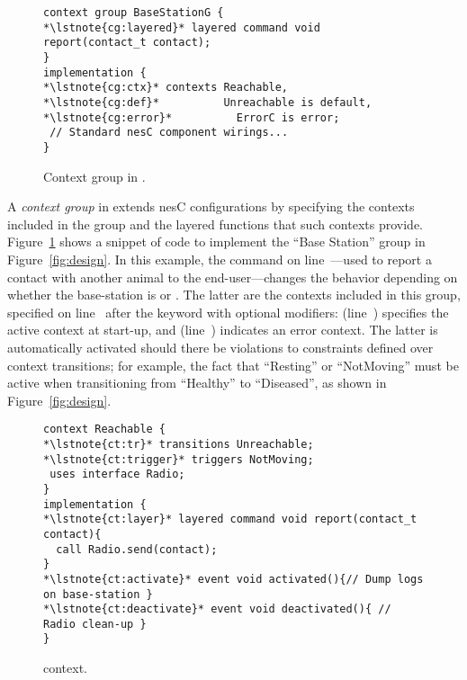 \begin{figure}[!tb]
\begin{lstlisting}[style=conescframe]
context group BaseStationG {
*\lstnote{cg:layered}* layered command void report(contact_t contact);
}
implementation {
*\lstnote{cg:ctx}* contexts Reachable, 
*\lstnote{cg:def}*          Unreachable is default,
*\lstnote{cg:error}*          ErrorC is error;
 // Standard nesC component wirings... 
}
\end{lstlisting}
\vspace{-4mm}
\caption{Context group in \conesc.}
  \label{fig:configuration}
\vspace{-2mm}
\end{figure}

A \emph{context group} in \conesc extends nesC configurations
by specifying the contexts included in the group and the layered
functions that such contexts provide.  Figure~\ref{fig:configuration}
shows a snippet of \conesc code to implement the ``Base Station''
group in Figure~\ref{fig:design}. In this example, the 
command on line~---used to report a contact with
another animal to the end-user---changes the behavior depending on
whether the base-station is  or
. The latter are the contexts included in this
group, specified on line~ after the keyword
 with optional modifiers: 
(line~) specifies the active context at start-up, and
 (line~) indicates an error
context. The latter is automatically activated should there be
violations to constraints defined over context transitions; for
example, the fact that ``Resting'' or ``NotMoving'' must be active
when transitioning from ``Healthy'' to ``Diseased'', as shown in
Figure~\ref{fig:design}.

\begin{figure}[!tb]
\begin{lstlisting}[style=conescframe]
context Reachable {
*\lstnote{ct:tr}* transitions Unreachable;
*\lstnote{ct:trigger}* triggers NotMoving;
 uses interface Radio;
} 
implementation {
*\lstnote{ct:layer}* layered command void report(contact_t contact){
  call Radio.send(contact);
}
*\lstnote{ct:activate}* event void activated(){// Dump logs on base-station }
*\lstnote{ct:deactivate}* event void deactivated(){ // Radio clean-up }
}
\end{lstlisting}
\vspace{-4mm}
\caption{\conesc context.}
  \label{fig:context}
\vspace{-2mm}
\end{figure}

